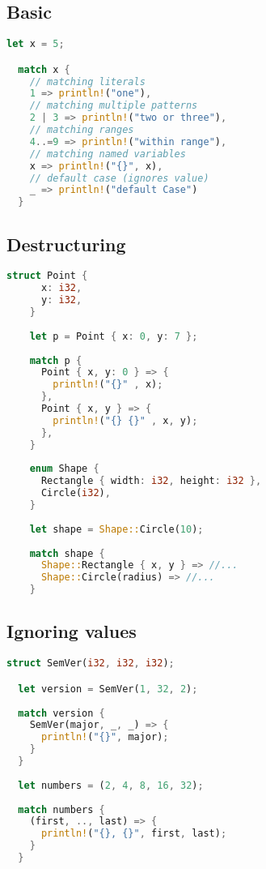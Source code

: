 \documentclass{article}
\begin{document}
\subsection{Basic}

\begin{lstlisting}[language=Rust, style=boxed, numbers=none]
  let x = 5;

  match x {
    // matching literals
    1 => println!("one"),
    // matching multiple patterns
    2 | 3 => println!("two or three"),
    // matching ranges
    4..=9 => println!("within range"),
    // matching named variables
    x => println!("{}", x),
    // default case (ignores value)
    _ => println!("default Case")
  }
\end{lstlisting}

\pagebreak

\subsection{Destructuring}

\begin{lstlisting}[language=Rust, style=boxed, numbers=none]
  struct Point {
      x: i32,
      y: i32,
    }
    
    let p = Point { x: 0, y: 7 };
    
    match p {
      Point { x, y: 0 } => {
        println!("{}" , x);
      },
      Point { x, y } => {
        println!("{} {}" , x, y);
      },
    }
    
    enum Shape {
      Rectangle { width: i32, height: i32 },
      Circle(i32),
    }
    
    let shape = Shape::Circle(10);
    
    match shape {
      Shape::Rectangle { x, y } => //...
      Shape::Circle(radius) => //...
    }
\end{lstlisting}

\subsection{Ignoring values}

\begin{lstlisting}[language=Rust, style=boxed, numbers=none]
  struct SemVer(i32, i32, i32);

  let version = SemVer(1, 32, 2);
  
  match version {
    SemVer(major, _, _) => {
      println!("{}", major);
    }
  }
  
  let numbers = (2, 4, 8, 16, 32);
  
  match numbers {
    (first, .., last) => {
      println!("{}, {}", first, last);
    }
  }
\end{lstlisting}
\end{document}

